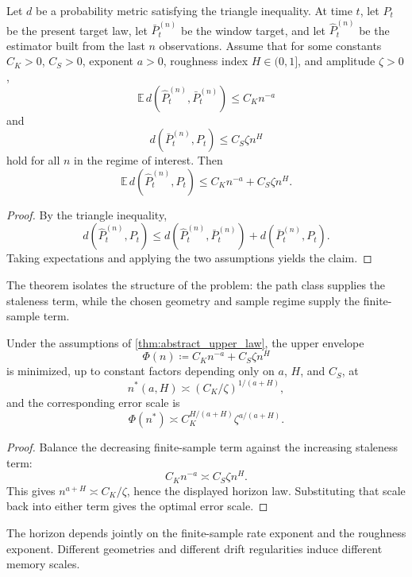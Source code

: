 \begin{theorem}\label{thm:abstract_upper_law}
Let $d$ be a probability metric satisfying the triangle inequality. At time $t$,
let $P_t$ be the present target law, let $\bar P_t^{(n)}$ be the window target,
and let $\widehat P_t^{(n)}$ be the estimator built from the last $n$
observations. Assume that for some constants $C_K>0$, $C_S>0$, exponent $a>0$,
roughness index $H\in(0,1]$, and amplitude $\zeta>0$,
\[
  \mathbb E\,d\!\left(\widehat P_t^{(n)},\bar P_t^{(n)}\right)
  \le C_K n^{-a}
\]
and
\[
  d\!\left(\bar P_t^{(n)},P_t\right)
  \le C_S\zeta n^H
\]
hold for all $n$ in the regime of interest. Then
\[
  \mathbb E\,d\!\left(\widehat P_t^{(n)},P_t\right)
  \le C_K n^{-a} + C_S\zeta n^H.
\]
\end{theorem}

\begin{proof}
By the triangle inequality,
\[
  d\!\left(\widehat P_t^{(n)},P_t\right)
  \le
  d\!\left(\widehat P_t^{(n)},\bar P_t^{(n)}\right)
  + d\!\left(\bar P_t^{(n)},P_t\right).
\]
Taking expectations and applying the two assumptions yields the claim.
\end{proof}

The theorem isolates the structure of the problem:
the path class supplies the staleness term, while the chosen geometry and sample
regime supply the finite-sample term.

\begin{corollary}
\label{cor:temporal_validity_horizon}
Under the assumptions of \cref{thm:abstract_upper_law}, the upper envelope
\[
  \Phi(n) \coloneqq C_K n^{-a} + C_S\zeta n^H
\]
is minimized, up to constant factors depending only on $a$, $H$, and $C_S$, at
\[
  n^*(a,H) \asymp (C_K/\zeta)^{1/(a+H)},
\]
and the corresponding error scale is
\[
  \Phi(n^*) \asymp C_K^{H/(a+H)}\zeta^{a/(a+H)}.
\]
\end{corollary}

\begin{proof}
Balance the decreasing finite-sample term against the increasing staleness term:
\[
  C_K n^{-a} \asymp C_S\zeta n^H.
\]
This gives $n^{a+H}\asymp C_K/\zeta$, hence the displayed horizon law. Substituting
that scale back into either term gives the optimal error scale.
\end{proof}

The horizon depends jointly on the finite-sample rate exponent and the
roughness exponent. Different geometries and different drift regularities induce
different memory scales.


